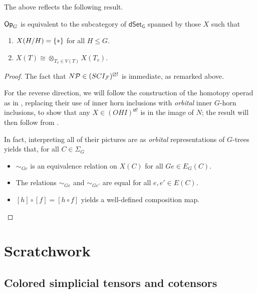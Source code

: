 \documentclass[a4paper,10pt
]{article}%
\renewcommand{\F}{\mathcal F}
\renewcommand{\1}{\ensuremath{\mathbb{id}}}
\begin{document}
The above reflects the following result.

\begin{proposition}
      $\mathsf{Op}_G$ is equivalent to the subcategory of $\mathsf{dSet_G}$ spanned by those $X$ such that
      \begin{enumerate}
      \item $X(H/H) = \set{\**}$ for all $H \leq G$.
      \item $X(T) \cong \otimes_{T_v \in V(T)}X(T_v)$. 
      \end{enumerate}
\end{proposition}
\begin{proof}
      The fact that $N\P \in (SCI_{\F})^{\boxslash !}$ is immediate, as remarked above.

      For the reverse direction, we will follow the construction of the homotopy operad as in \cite[\S 6]{MW09},
      replacing their use of inner horn inclusions with \textit{orbital} inner $G$-horn inclusions,
      to show that any $X \in (OHI)^{\boxslash !}$ is in the image of $N$; 
      the result will then follow from \cite[HYPER PROP]{BP18}.

      In fact, interpreting all of their pictures are as \textit{orbital} representations of $G$-trees yields that,
      for all $C \in \Sigma_G$
      \begin{itemize}
      \item $\sim_{G e}$ is an equivalence relation on $X(C)$ for all $Ge \in E_G(C)$.
      \item The relations $\sim_{G e}$ and $\sim_{G e'}$ are equal for all $e,e'\in E(C)$.
      \item $[h] \circ [f] = [h \circ f]$ yields a well-defined composition map.
      \end{itemize}
\end{proof}



\newpage



\section{Scratchwork}

\subsection{Colored simplicial tensors and cotensors}
\end{document}
